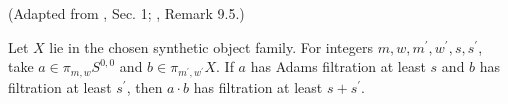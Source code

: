 \begin{theorem}
\label{frontier:Literature:3dfd6c694616}
(Adapted from \cite{Moss}, Sec. 1; \cite{BHS}, Remark 9.5.)\par{}

Let $X$ lie in the chosen synthetic object family. For integers $m,w,m^{\prime},w^{\prime},s,s^{\prime}$, take $a\in\pi_{m,w}S^{0,0}$ and $b\in\pi_{m^{\prime},w^{\prime}}X$. If $a$ has Adams filtration at least $s$ and $b$ has filtration at least $s^{\prime}$, then $a\cdot b$ has filtration at least $s+s^{\prime}$.
\end{theorem}


